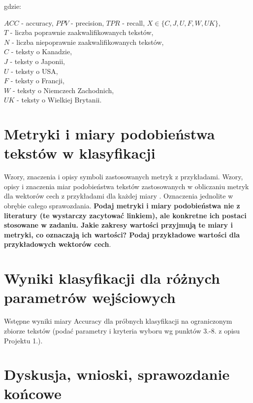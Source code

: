 \documentclass{article}
\begin{document}
gdzie:
\begin{flushleft}
\(ACC\) - accuracy, \(PPV\) - precision, \(TPR\) - recall, \(X \in \{C, J, U, F, W, UK \}\), \\
\( T \) - liczba poprawnie zaakwalifikowanych tekstów, \\
\( N \) - liczba niepoprawnie zaakwalifikowanych tekstów, \\
\( C \) - teksty o Kanadzie, \\
\( J \) - teksty o Japonii, \\
\( U \) - teksty o USA, \\
\( F \) - teksty o Francji, \\
\( W \) - teksty o Niemczech Zachodnich, \\
\( UK \) - teksty o Wielkiej Brytanii. \\
\end{flushleft}



\section{Metryki i miary podobieństwa tekstów w klasyfikacji}

Wzory, znaczenia i opisy symboli zastosowanych metryk z
przykładami. Wzory, opisy i znaczenia miar
podobieństwa tekstów zastosowanych w obliczaniu metryk dla wektorów cech z
przykładami dla każdej miary \cite{niewiadomski08}.  Oznaczenia jednolite w obrębie całego sprawozdania.  {\bf Podaj metryki i miary
podobieństwa nie z literatury (te wystarczy zacytować linkiem), ale konkretne ich
postaci stosowane w zadaniu. Jakie zakresy wartości przyjmują te miary i
metryki, co oznaczają ich wartości? Podaj przykładowe wartości dla przykładowych wektorów cech}. \\ 

\section{Wyniki klasyfikacji dla różnych parametrów wejściowych}
Wstępne wyniki miary Accuracy dla próbnych klasyfikacji na ograniczonym zbiorze tekstów (podać parametry i kryteria
wyboru wg punktów 3.-8. z opisu Projektu 1.). 


\section{Dyskusja, wnioski, sprawozdanie końcowe}
\end{document}
